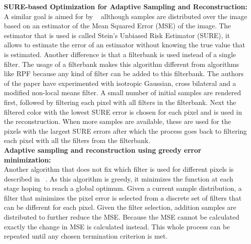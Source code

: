 \textbf{SURE-based Optimization for Adaptive Sampling and Reconstruction:} \\
A similar goal is aimed for by ~\cite{Li:2012:SBO} allthough samples are distributed over the image based on an estimator of the Mean Squared Error (MSE) of the image.
The estimator that is used is called Stein's Unbiased Risk Estimator (SURE), it allows to estimate the error of an estimator without knowing the true value that is estimated.
Another difference is that a filterbank is used instead of a single filter.
The usage of a filterbank makes this algorithm different from algorithms like RPF because any kind of filter can be added to this filterbank.
The authors of the paper have experimented with isotropic Gaussian, cross bilateral and a modified non-local means filter.
A small number of initial samples are rendered first, followed by filtering each pixel with all filters in the filterbank.
Next the filtered color with the lowest SURE error is chosen for each pixel and is used in the reconstruction.
When more samples are available, these are used for the pixels with the largest SURE errors after which the process goes back to filtering each pixel with all the filters from the filterbank.
\\

\textbf{Adaptive sampling and reconstruction using greedy error minimization:} \\
Another algorithm that does not fix which filter is used for different pixels is described in ~\cite{Rousselle:2011:ASR:2070781.2024193}.
As this algorithm is greedy, it minimizes the function at each stage hoping to reach a global optimum.
Given a current sample distribution, a filter that minimizes the pixel error is selected from a discrete set of filters that can be different for each pixel.
Given the filter selection, addition samples are distributed to further reduce the MSE.
Because the MSE cannot be calculated exactly the change in MSE is calculated instead.
This whole process can be repeated until any chosen termination criterion is met.
\\

